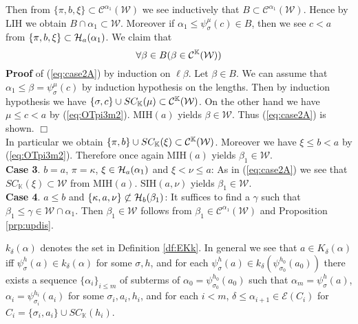 \documentclass{article}
\newcommand{\mK}{\mathbb{K}}
\begin{document}
Then from $\{\pi,b,\xi\}\subset\mathcal{C}^{\alpha_{1}}(\mathcal{W})$ we see inductively that
$B\subset\mathcal{C}^{\alpha_{1}}(\mathcal{W})$.
Hence by LIH we obtain $B\cap\alpha_{1}\subset\mathcal{W}$.
Moreover if $\alpha_{1}\leq\psi_{\sigma}^{\mu}(c)\in B$, then 
we see $c<a$ 
from $\{\pi,b,\xi\}\subset{\cal H}_{a}(\alpha_{1})$.
We claim that
\begin{equation}\label{eq:case2A}
\forall\beta\in B(\beta\in\mathcal{C}^{\mK}(\calw))
\end{equation}
\textbf{Proof} of (\ref{eq:case2A}) by induction on $\ell\beta$.
Let $\beta\in B$. We can assume that $\alpha_{1}\leq\beta=\psi_{\sigma}^{\mu}(c)$ by induction hypothesis on the lengths.
Then by induction hypothesis we have $\{\sigma,c\}\cup SC_{\mK}(\mu)\subset\mathcal{C}^{\mK}(\calw)$.
On the other hand we have $\mu\leq c<a$ by (\ref{eq:OTpi3m2}).
$\mbox{MIH}(a)$ yields $\beta\in\mathcal{W}$.
Thus (\ref{eq:case2A}) is shown.
\hspace*{\fill} $\Box$
\\

In particular we obtain $\{\pi,b\}\cup SC_{\mK}(\xi)\subset \mathcal{C}^{\mK}(\calw)$.
Moreover we have $\xi\leq b<a$ by (\ref{eq:OTpi3m2}).
Therefore once again $\mbox{MIH}(a)$ yields $\beta_{1}\in\mathcal{W}$.
\\
\textbf{Case 3}. 
$b=a$, $\pi=\kappa$, $\xi\in{\cal H}_{a}(\alpha_{1})$ and $\xi<\nu\leq a$: 
As in (\ref{eq:case2A}) we see that $SC_{\mK}(\xi)\subset\mathcal{W}$ from $\mbox{MIH}(a)$.
$\mbox{SIH}(a,\nu)$ yields $\beta_{1}\in\mathcal{W}$.
\\
\textbf{Case 4}.
$a\leq b$ and $\{\kappa,a,\nu\}\not\subset{\cal H}_{b}(\beta_{1})$:
It suffices to find a $\gamma$ such that $\beta_{1}\leq\gamma\in\mathcal{W}\cap\alpha_{1}$.
Then $\beta_{1}\in\mathcal{W}$ follows from $\beta_{1}\in\mathcal{C}^{\alpha_{1}}(\mathcal{W})$ and Proposition \ref{prp:updis}.


$k_{\delta}(\alpha)$ denotes the set in Definition \ref{df:EKk}.
In general we see that $a\in K_{\delta}(\alpha)$ iff $\psi_{\sigma}^{h}(a)\in k_{\delta}(\alpha)$ for some $\sigma,h$,
and for each $\psi_{\sigma}^{h}(a)\in k_{\delta}(\psi_{\sigma_{0}}^{h_{0}}(a_{0}))$ there exists a sequence
$\{\alpha_{i}\}_{i\leq m}$ of subterms of $\alpha_{0}=\psi_{\sigma_{0}}^{h_{0}}(a_{0})$ such that 
$\alpha_{m}=\psi_{\sigma}^{h}(a)$, 
$\alpha_{i}=\psi_{\sigma_{i}}^{h_{i}}(a_{i})$ for some $\sigma_{i},a_{i},h_{i}$,
and for each $i<m$,
$\delta\leq\alpha_{i+1}\in\mathcal{E}(C_{i})$ for $C_{i}=\{\sigma_{i},a_{i}\}\cup SC_{\mK}(h_{i})$.
\end{document}
